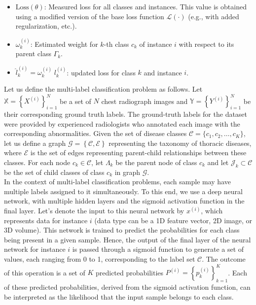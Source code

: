 \documentclass[authoryear,preprint,review,12pt]{elsarticle}
\begin{document}
\begin{itemize}
    \item  $\text{Loss}(\theta) $: Measured loss for all classes and instances. This value is obtained using a modified version of the base loss function $\mathcal{L}(\cdot) $ (e.g., with added regularization, etc.).
    \item  $\omega_k^{(i)} $: Estimated weight for $k$-th class $c_k $ of instance $i $ with respect to its parent class $\Gamma_k $.
    \item  ${\widehat l}_k^{(i)} = \omega_k^{(i)} \; l_k^{(i)} $: updated loss for class $k $ and instance $i $.
\end{itemize}
Let us define the multi-label classification problem as follows. Let $\mathbb{X} = {\left\{X^{(i)}\right\}}_{i=1}^{N} $ be a set of $N $ chest radiograph images and $\mathbb{Y} = {\left\{Y^{(i)}\right\}}_{i=1}^{N} $ be their corresponding ground truth labels. The ground-truth labels for the dataset were provided by experienced radiologists who annotated each image with the corresponding abnormalities.
Given the set of disease classes $\mathcal{C} = \{c_1,c_2,\dots,c_K\} $, let us define a  graph $\mathcal{G}=\left\{\mathcal{C},\mathcal{E}\right\} $ representing the taxonomy of thoracic diseases, where $\mathcal{E}$ is the set of edges representing parent-child relationships between these classes. For each node $c_k \in \mathcal{C} $, let $\Lambda_k$ be the parent node of class $c_k $ and let $\mathcal{J}_k\subset \mathcal{C} $ be the set of child classes of class $c_k $ in graph $\mathcal{G}$. \\
In the context of multi-label classification problems, each sample may have multiple labels assigned to it simultaneously. To this end, we use a deep neural network, with multiple hidden layers and the sigmoid activation function in the final layer. Let's denote the input to this neural network by $x^{(i)}$, which represents data for instance $i$ (data type can be a 1D feature vector, 2D image, or 3D volume). This network is trained to predict the probabilities for each class being present in a given sample. Hence, the output of the final layer of the neural network for instance $i$ is passed through a sigmoid function to generate a set of values, each ranging from 0 to 1, corresponding to the label set $\mathcal{C} $.
The outcome of this operation is a set of $K $ predicted probabilities $P^{(i)}={\left\{p_k^{(i)}\right\}}_{k=1}^{K} $. Each of these predicted probabilities, derived from the sigmoid activation function, can be interpreted as the likelihood that the input sample belongs to each class.
\end{document}
